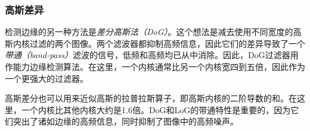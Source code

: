 

\subsubsection{高斯差异}
检测边缘的另一种方法是\emph{差分高斯法（DoG）}。这个想法是减去使用不同宽度的高斯内核过滤的两个图像。两个滤波器都抑制高频信息，因此它们的差异导致了一个\emph{带通（band-pass）}滤波的信号，低频和高频均已从中消除。因此，DoG过滤器用作能力边缘检测算法。在这里，一个内核通常比另一个内核宽四到五倍，因此作为一个更强大的过滤器。

高斯差分也可以用来近似高斯的拉普拉斯算子，即高斯内核的二阶导数的和。在这里，一个内核比其他内核大约是1.6倍。DoG和LoG的带通特性是重要的，因为它们突出了诸如边缘的高频信息，同时抑制了图像中的高频噪声。



